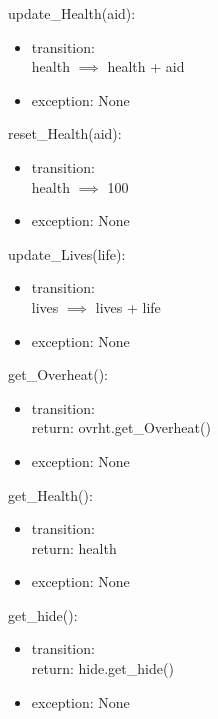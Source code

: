 \documentclass[12pt, titlepage]{article}
\begin{document}
\noindent update\_Health(aid): 
\begin{itemize}
\item transition:\\
health $\implies$ health + aid\\
\item exception: None\\
\end{itemize}

\noindent reset\_Health(aid): 
\begin{itemize}
\item transition:\\
health $\implies$ 100\\
\item exception: None\\
\end{itemize}

\noindent update\_Lives(life): 
\begin{itemize}
\item transition:\\
lives $\implies$ lives + life\\
\item exception: None\\
\end{itemize}

\noindent get\_Overheat(): 
\begin{itemize}
\item transition:\\
return: ovrht.get\_Overheat()\\
\item exception: None\\
\end{itemize}

\noindent get\_Health(): 
\begin{itemize}
\item transition:\\
return: health\\
\item exception: None\\
\end{itemize}

\noindent get\_hide(): 
\begin{itemize}
\item transition:\\
return: hide.get\_hide()\\
\item exception: None\\
\end{itemize}
\end{document}

